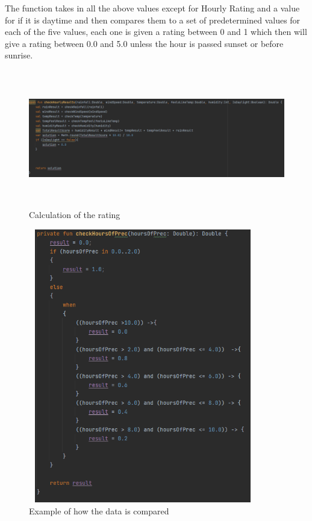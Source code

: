The function takes in all the above values except for Hourly Rating and a value for if it is daytime and then compares them to a set of predetermined values for each of the five values, each one is given a rating between 0 and 1 which then will give a rating between 0.0 and 5.0 unless the hour is passed sunset or before sunrise.

\begin{figure}[H]
    \centering
    \includegraphics[width=16cm,height = 6cm]{img/DataComparison.PNG}
    \caption{Calculation of the rating}
    \label{fig:Calculation of the rating}
\end{figure}

\begin{figure}[H]
    \centering
    \includegraphics[width=10cm,height = 12cm]{img/DataComparisonExample.PNG}
    \caption{Example of how the data is compared}
    \label{fig:altas config}
\end{figure}

